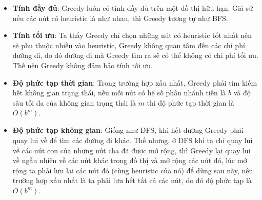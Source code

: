 \begin{itemize}
    \item \textbf{Tính đầy đủ}: Greedy luôn có tính đầy đủ trên một đồ thị hữu hạn. Giả sử nếu các nút có heuristic là như nhau, thì Greedy tương tự như BFS.

    \item \textbf{Tính tối ưu}: Ta thấy Greedy chỉ chọn những nút có heuristic tốt nhất nên sẽ phụ thuộc nhiều vào heuristic, Greedy không quan tâm đến các chi phí đường đi, do đó đường đi mà Greedy tìm ra sẽ có thể không có chi phí tối ưu. Thế nên Greedy không đảm bảo tính tối ưu.

    \item \textbf{Độ phức tạp thời gian}: Trong trường hợp xấu nhất, Greedy phải tìm kiếm hết không gian trạng thái, nếu mỗi nút có hệ số phân nhánh tiến là $b$ và độ sâu tối đa của không gian trạng thái là $m$ thì độ phức tạp thời gian là $O(b^m)$.

    \item \textbf{Độ phức tạp không gian}: Giống như DFS, khi hết đường Greedy phải quay lui về để tìm các đường đi khác. Thế nhưng, ở DFS khi ta chỉ quay lui về các nút con của những nút cha đã được mở rộng, thì Greedy lại quay lui về ngẫu nhiên về các nút khác trong đồ thị và mở rộng các nút đó, lúc mở rộng ta phải lưu lại các nút đó (cùng heuristic của nó) để dùng sau này, nên trường hợp xấu nhất là ta phải lưu hết tất cả các nút, do đó độ phức tạp là $O(b^m)$.
\end{itemize}